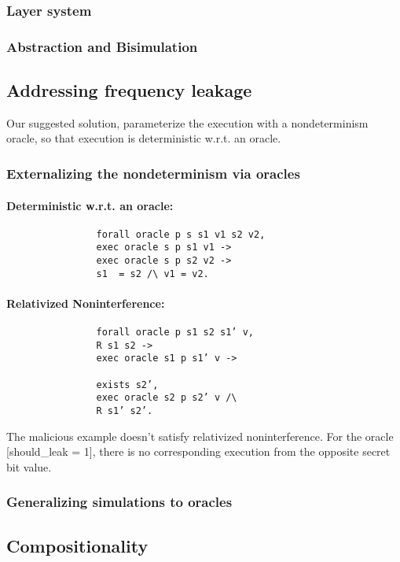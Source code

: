\documentclass[onecolumn]{paper}
\begin{document}
		\subsubsection{Layer system}
		\subsubsection{Abstraction and Bisimulation}

	\subsection{Addressing frequency leakage}
	Our suggested solution, parameterize the execution with a nondeterminism oracle, so that execution is deterministic w.r.t. an oracle.
		
		\subsubsection{Externalizing the nondeterminism via oracles}
			\paragraph{Deterministic w.r.t. an oracle:}
			\begin{verbatim}
				forall oracle p s s1 v1 s2 v2,
				exec oracle s p s1 v1 ->
				exec oracle s p s2 v2 ->
				s1  = s2 /\ v1 = v2.
			\end{verbatim}
	
			\paragraph{Relativized Noninterference:}
			\begin{verbatim}
				forall oracle p s1 s2 s1’ v,
				R s1 s2 ->
				exec oracle s1 p s1’ v ->
				
				exists s2’,
				exec oracle s2 p s2’ v /\
				R s1’ s2’.
			\end{verbatim}
						
			The malicious example doesn’t satisfy relativized noninterference. For the oracle [should\_leak = 1], there is no corresponding execution from the opposite secret bit value.
		\subsubsection{Generalizing simulations to oracles}

	\subsection{Compositionality}
\end{document}
